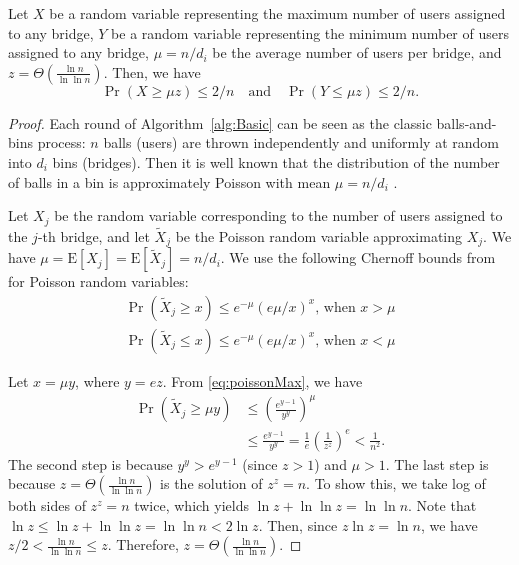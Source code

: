 \documentclass{llncs}
\newcommand{\E}{\mathbf{\mathrm{E}}}
\newcommand{\sfsize}{\fontsize{0.73\baselineskip}{0.73\baselineskip}\selectfont}
\newcommand{\sans}[1]{\textsf{\sfsize \mbox{#1}}}
\newcommand{\sansb}[1]{\textbf{\sans{\mbox{#1}}}}
\begin{document}
\begin{lemma}[\sansb{Bridge Load-Balancing}]
	Let $X$ be a random variable representing the maximum number of users assigned to any bridge, $Y$ be a random variable representing the minimum number of users assigned to any bridge, ${\mu = n/d_i}$ be the average number of users per bridge, and $z = \Theta\left(\frac{\ln{n}}{\ln{\ln{n}}}\right)$. Then, we have 
	\[
	\Pr\left(X \geq \mu z\right) \leq 2/n \quad \text{and} \quad 
	\Pr\left(Y \leq \mu z\right) \leq 2/n.
	\]
\end{lemma}
\begin{proof}
	Each round of Algorithm~\ref{alg:Basic} can be seen as the classic balls-and-bins process: $n$ balls (users) are thrown independently and uniformly at random into $d_i$ bins (bridges). Then it is well known that the distribution of the number of balls in a bin is approximately Poisson with mean ${\mu = n/d_i}$ \cite[Chapter~5]{Michael2005}.
	
	Let $X_j$ be the random variable corresponding to the number of users assigned to the $j$-th bridge, and let $\tilde{X}_j$ be the Poisson random variable approximating $X_j$. We have ${\mu = \E[X_j] = \E[\tilde{X}_j] = n/d_i}$. We use the following Chernoff bounds from \cite[Chapter~5]{Michael2005} for Poisson random variables:
	\begin{align}
	\Pr(\tilde{X}_j \geq x) \leq e^{-\mu}(e\mu/x)^x \text{, when } x > \mu \label{eq:poissonMax}\\
	\Pr(\tilde{X}_j \leq x) \leq e^{-\mu}(e\mu/x)^x \text{, when } x < \mu \label{eq:poissonMin}
	\end{align}
	
	\noindent Let ${x = \mu y}$, where ${y = ez}$. From \eqref{eq:poissonMax}, we have
	\begin{align}
	\Pr(\tilde{X}_j \geq \mu y) &\leq \left(\frac{e^{y-1}}{y^y}\right)^\mu \nonumber \\
	&\leq \frac{e^{y-1}}{y^y} 
	= \frac{1}{e}\left(\frac{1}{z^z}\right)^e < \frac{1}{n^2}. \label{eq:approxBound}
	\end{align}
	The second step is because ${y^y > e^{y-1}}$ (since ${z > 1}$) and ${\mu > 1}$. The last step is because ${z = \Theta\left(\frac{\ln{n}}{\ln{\ln{n}}}\right)}$ is the solution of ${z^z = n}$. To show this, we take log of both sides of ${z^z = n}$ twice, which yields $\ln{z} + \ln{\ln{z}} = \ln{\ln{n}}$.  Note that $\ln{z} \leq \ln{z} + \ln{\ln{z}} = \ln{\ln{n}} < 2\ln{z}.$  Then, since $z\ln{z} = \ln{n}$, we have $z/2 < \frac{\ln{n}}{\ln{\ln{n}}} \leq z.$
	Therefore, $z = \Theta\left(\frac{\ln{n}}{\ln{\ln{n}}}\right)$. 
	

\end{proof}
\end{document}
